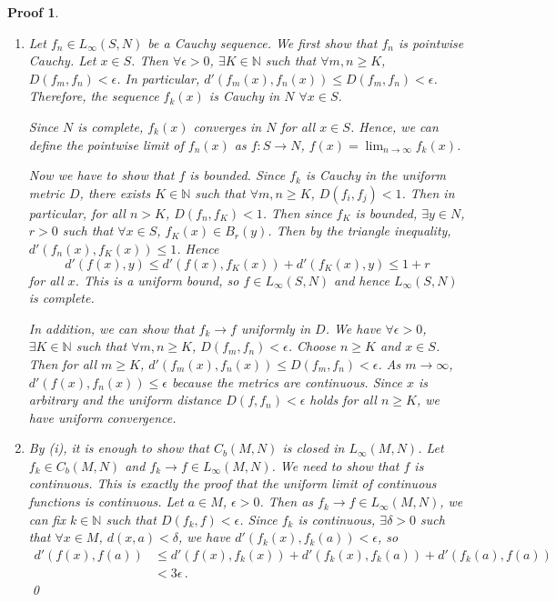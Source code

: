 \documentclass{article}
\theoremstyle{plain}\theoremheaderfont{\normalfont\itshape}\theorembodyfont{\rmfamily}\theoremseparator{.}\newtheorem*{rem}{Remark}\newtheorem*{ex}{Example}\newtheorem*{proof}{Proof}\newtheorem*{altp}{Alternative proof}
\theoremstyle{plain}\theoremheaderfont{\normalfont\bfseries}\theorembodyfont{\rmfamily}\theoremseparator{.}\newtheorem{thm}{Theorem}[section]\newtheorem{lem}[thm]{Lemma}\newtheorem{prop}[thm]{Proposition}\newtheorem*{cor}{Corollary}\newtheorem{defn}[thm]{Definition}\newtheorem{clm}[thm]{Claim}\newtheorem{clminproof}{Claim}
\theoremstyle{break}\theoremheaderfont{\normalfont\itshape}\theorembodyfont{\rmfamily}\theoremseparator{.\medskip}\newtheorem*{proofskip}{Proof}\newtheorem*{exs}{Examples}\newtheorem*{rems}{Remarks}
\theoremstyle{break}\theoremheaderfont{\normalfont\bfseries}\theorembodyfont{\rmfamily}\theoremseparator{.\medskip}\newtheorem{lemskip}[thm]{Lemma}\newtheorem{defnskip}[thm]{Definition}\newtheorem{propskip}[thm]{Proposition}\newtheorem{thmskip}[thm]{Theorem}
\newcommand{\qed}{\hfill\ensuremath{\Box}}
\begin{document}
    \begin{proofskip}
        \begin{enumerate}[label=(\roman*),topsep=0pt]
            \item Let \(f_n\in L_\infty(S,N)\) be a Cauchy sequence. We first show that \(f_n\) is pointwise Cauchy. Let \(x\in S\). Then \(\forall\epsilon>0\), \(\exists K\in\mathbb{N}\) such that \(\forall m,n\ge K\), \(D(f_m,f_n)<\epsilon\). In particular, \(d'(f_m(x),f_n(x))\le D(f_m,f_n)<\epsilon\). Therefore, the sequence \(f_k(x)\) is Cauchy in \(N\) \(\forall x\in S\).
            
            Since \(N\) is complete, \(f_k(x)\) converges in \(N\) for all \(x\in S\). Hence, we can define the pointwise limit of \(f_n(x)\) as \(f:S\to N\), \(f(x)=\lim_{n\to\infty}f_k(x)\).

            Now we have to show that \(f\) is bounded. Since \(f_k\) is Cauchy in the uniform metric \(D\), there exists \(K\in\mathbb{N}\) such that \(\forall m,n\ge K\), \(D(f_i,f_j)<1\). Then in particular, for all \(n>K\), \(D(f_n,f_K)<1\). Then since \(f_K\) is bounded, \(\exists y\in N\), \(r>0\) such that \(\forall x\in S\), \(f_K(x)\in B_r(y)\). Then by the triangle inequality, \(d'(f_n(x),f_K(x))\le 1\). Hence
            \[d'(f(x),y)\le d'(f(x),f_K(x))+d'(f_K(x),y)\le 1+r\]
            for all \(x\). This is a uniform bound, so \(f\in L_\infty(S,N)\) and hence \(L_\infty(S,N)\) is complete.

            In addition, we can show that \(f_k\to f\) uniformly in \(D\). We have \(\forall\epsilon>0\), \(\exists K\in\mathbb{N}\) such that \(\forall m,n\ge K\), \(D(f_m,f_n)<\epsilon\). Choose \(n\ge K\) and \(x\in S\). Then for all \(m\ge K\), \(d'(f_m(x),f_n(x))\le D(f_m,f_n)<\epsilon\). As \(m\to\infty\), \(d'(f(x),f_n(x))\le\epsilon\) because the metrics are continuous. Since \(x\) is arbitrary and the uniform distance \(D(f,f_n)<\epsilon\) holds for all \(n\ge K\), we have uniform convergence.
            \item By (i), it is enough to show that \(C_b(M,N)\) is closed in \(L_\infty(M,N)\). Let \(f_k\in C_b(M,N)\) and \(f_k\to f\in L_\infty(M,N)\). We need to show that \(f\) is continuous. This is exactly the proof that the uniform limit of continuous functions is continuous. Let \(a\in M\), \(\epsilon>0\). Then as \(f_k\to f\in L_\infty(M,N)\), we can fix \(k\in\mathbb{N}\) such that \(D(f_k,f)<\epsilon\). Since \(f_k\) is continuous, \(\exists\delta>0\) such that \(\forall x\in M\), \(d(x,a)<\delta\), we have \(d'(f_k(x),f_k(a))<\epsilon\), so
            \begin{align*}
                d'(f(x),f(a))&\le d'(f(x),f_k(x))+d'(f_k(x),f_k(a))+d'(f_k(a),f(a))\\
                &< 3\epsilon\,.
            \end{align*}\qed
        \end{enumerate}
    \end{proofskip}
\end{document}
